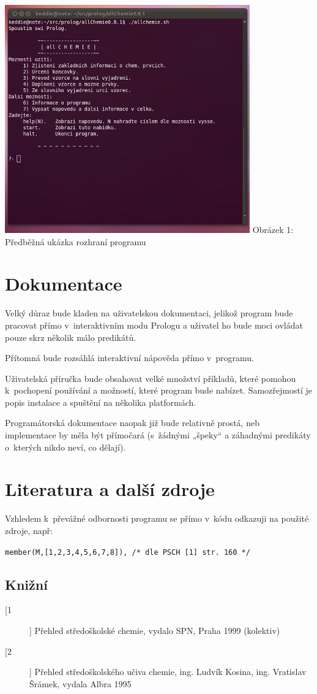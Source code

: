 \documentclass{article}
\begin{document}
\begin{center}
\includegraphics[scale=1]{allchemie-screen.png}
Obrázek 1: Předběžná ukázka rozhraní programu
\end{center}

\section{Dokumentace}
Velký důraz bude kladen na uživatelskou dokumentaci, jelikož program
bude pracovat přímo v~interaktivním modu Prologu a uživatel ho bude
moci ovládat pouze skrz několik málo predikátů. 

Přítomná bude rozsáhlá interaktivní nápověda přímo v~programu.

Uživatelská příručka bude obsahovat velké množství příkladů, které
pomohou k~pochopení používání a možností, které program bude nabízet.
Samozřejmostí je popis instalace a spuštění na několika platformách.

Programátorská dokumentace naopak již bude relativně prostá, neb
implementace by měla být přímočará (s~žádnými „špeky“ a záhadnými
predikáty o~kterých nikdo neví, co dělají).

\section{Literatura a další zdroje}
Vzhledem k~převážné odbornosti programu se přímo v~kódu odkazuji na
použité zdroje, např:

\texttt{member(M,[1,2,3,4,5,6,7,8]),  /* dle PSCH [1] str. 160 */}

\subsection{Knižní}
\begin{description}
\item[[1]] Přehled středoškolské chemie, vydalo SPN, Praha 1999 (kolektiv)
\item[[2]] Přehled středoškolského učiva chemie, ing. Ludvík Kosina, ing.
Vratislav Šrámek, vydala Albra 1995
\end{description}
\end{document}
